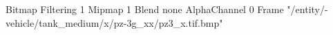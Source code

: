 {Bitmap
	{Filtering 1}
	{Mipmap 1}
	{Blend none}
	{AlphaChannel 0}
	{Frame "/entity/-vehicle/tank_medium/x/pz-3g_xx/pz3_x.tif.bmp"}

}
